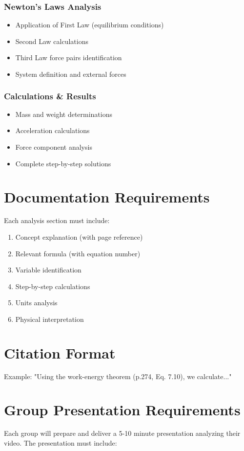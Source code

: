 \documentclass[12pt]{article}
\begin{document}
\subsubsection{Newton's Laws Analysis}
\begin{itemize}
\item Application of First Law (equilibrium conditions)
\item Second Law calculations
\item Third Law force pairs identification
\item System definition and external forces
\end{itemize}

\subsubsection{Calculations \& Results}
\begin{itemize}
\item Mass and weight determinations
\item Acceleration calculations
\item Force component analysis
\item Complete step-by-step solutions
\end{itemize}

\section{Documentation Requirements}
Each analysis section must include:
\begin{enumerate}
\item Concept explanation (with page reference)
\item Relevant formula (with equation number)
\item Variable identification
\item Step-by-step calculations
\item Units analysis
\item Physical interpretation
\end{enumerate}

\section{Citation Format}
Example: "Using the work-energy theorem (p.274, Eq. 7.10), we calculate..."

\section{Group Presentation Requirements}
Each group will prepare and deliver a 5-10 minute presentation analyzing their video. The presentation must include:
\end{document}
